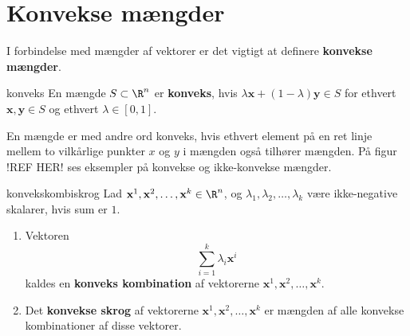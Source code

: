 \section{Konvekse mængder}
%
I forbindelse med mængder af vektorer er det vigtigt at definere \textbf{konvekse mængder}.
\begin{defn}{}{konveks}
En mængde $S \subset \R^n$ er \textbf{konveks}, hvis $\lambda \textbf{x} + (1- \lambda ) \textbf{y} \in S$ for ethvert $\textbf{x}, \textbf{y} \in S$ og ethvert $\lambda \in [0,1]$. 
\end{defn}
\noindent
%
En mængde er med andre ord konveks, hvis ethvert element på en ret linje mellem to vilkårlige punkter $x$ og $y$ i mængden også tilhører mængden. 
På figur !REF HER! ses eksempler på konvekse og ikke-konvekse mængder. 
%

%
%
%	
%
%
%
\begin{defn}{}{konvekskombiskrog}
Lad $\textbf{x}^1, \textbf{x}^2, \ldots, \textbf{x}^k \in \R^n$, og $\lambda_1, \lambda_2, \ldots, \lambda_k$ være ikke-negative skalarer, hvis sum er $1$. 
\begin{enumerate}[label=(\alph*)]
	\item Vektoren $$\sum_{i=1}^{k} \lambda_i \textbf{x}^i$$ kaldes en \textbf{konveks kombination} af vektorerne $\textbf{x}^1, \textbf{x}^2, \ldots, \textbf{x}^k$. 
	\item Det \textbf{konvekse skrog} af vektorerne $\textbf{x}^1, \textbf{x}^2, \ldots, \textbf{x}^k$ er mængden af alle konvekse kombinationer af disse vektorer. 
\end{enumerate}
\end{defn}
